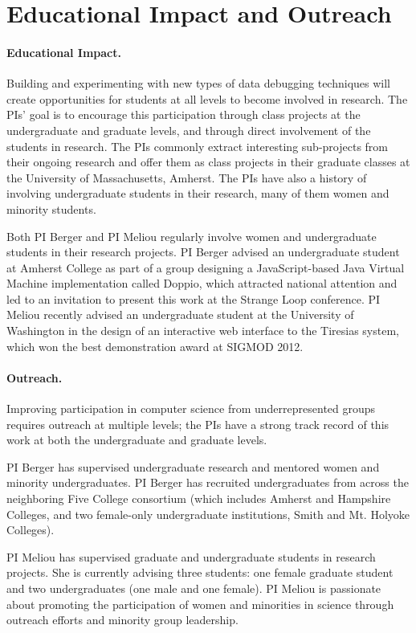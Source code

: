 \section{Educational Impact and Outreach}
\label{sec:impact}

\paragraph{Educational Impact.}

Building and experimenting with new types of data debugging techniques
will create opportunities for students at all levels to become
involved in research. The PIs' goal is to encourage this participation
through class projects at the undergraduate and graduate levels, and
through direct involvement of the students in research. The PIs
commonly extract interesting sub-projects from their ongoing research
and offer them as class projects in their graduate classes at the
University of Massachusetts, Amherst. The PIs have also a history of
involving undergraduate students in their research, many of them women
and minority students.

Both PI Berger and PI Meliou regularly involve women and undergraduate
students in their research projects. PI Berger advised an
undergraduate student at Amherst College as part of a group designing
a JavaScript-based Java Virtual Machine implementation called Doppio,
which attracted national attention and led to an invitation to present
this work at the Strange Loop conference.  PI Meliou recently advised
an undergraduate student at the University of Washington in the design
of an interactive web interface to the Tiresias system, which won the
best demonstration award at SIGMOD 2012.

\paragraph{Outreach.}
Improving participation in computer science from underrepresented groups
requires outreach at multiple levels; the PIs have a strong track record
of this work at both the undergraduate and graduate levels.

PI Berger has supervised undergraduate research and
mentored women and minority undergraduates. PI Berger has recruited undergraduates from
across the neighboring Five College consortium (which includes Amherst
and Hampshire Colleges, and two female-only undergraduate institutions,
Smith and Mt. Holyoke Colleges).

PI Meliou has supervised graduate and undergraduate students in
research projects. She is currently advising three students: one
female graduate student and two undergraduates (one male and one
female). PI Meliou is passionate about promoting the participation
of women and minorities in science through outreach efforts and
minority group leadership.

